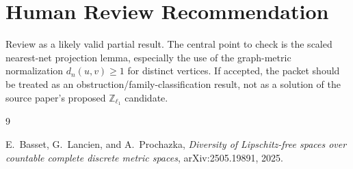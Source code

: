 \documentclass[11pt]{article}
\begin{document}
\section*{Human Review Recommendation}

Review as a likely valid partial result.  The central point to check is the
scaled nearest-net projection lemma, especially the use of the graph-metric
normalization $d_n(u,v)\geq 1$ for distinct vertices.  If accepted, the packet
should be treated as an obstruction/family-classification result, not as a
solution of the source paper's proposed $\mathbb Z_{\ell_1}$ candidate.

\begin{thebibliography}{9}

E.~Basset, G.~Lancien, and A.~Prochazka,
\emph{Diversity of Lipschitz-free spaces over countable complete discrete
metric spaces}, arXiv:2505.19891, 2025.

\end{thebibliography}
\end{document}
